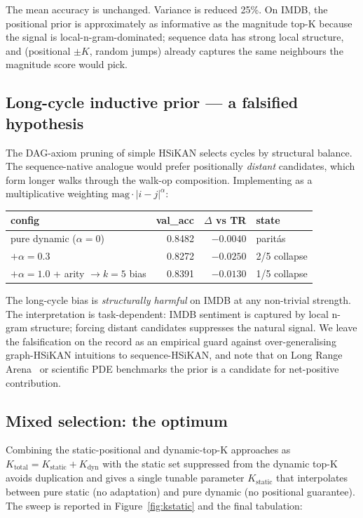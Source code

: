 \documentclass[11pt, a4paper]{article}
\begin{document}
The mean accuracy is unchanged. Variance is reduced 25\%. On IMDB,
the positional prior is approximately as informative as the
magnitude top-K because the signal is local-n-gram-dominated; sequence
data has strong local structure, and
(positional $\pm K$, random jumps) already captures the same
neighbours the magnitude score would pick.

\subsection{Long-cycle inductive prior --- a falsified hypothesis}

The DAG-axiom pruning of simple HSiKAN selects cycles by structural
balance. The sequence-native analogue would prefer positionally
\emph{distant} candidates, which form longer walks through the walk-op
composition. Implementing as a multiplicative weighting
$\mathrm{mag} \cdot |i - j|^{\alpha}$:

\begin{center}
\begin{tabular}{lrrl}
\toprule
config & val\_acc & $\Delta$ vs TR & state \\
\midrule
pure dynamic ($\alpha=0$) & 0.8482 & $-0.0040$ & paritás \\
$+ \alpha = 0.3$          & 0.8272 & $-0.0250$ & 2/5 collapse \\
$+ \alpha = 1.0$ + arity $\to k=5$ bias & 0.8391 & $-0.0130$ & 1/5 collapse \\
\bottomrule
\end{tabular}
\end{center}

The long-cycle bias is \emph{structurally harmful} on IMDB at any
non-trivial strength. The interpretation is task-dependent: IMDB
sentiment is captured by local n-gram structure; forcing distant
candidates suppresses the natural signal. We leave the falsification
on the record as an empirical guard against over-generalising
graph-HSiKAN intuitions to sequence-HSiKAN, and note that on Long
Range Arena~\cite{tay2020long} or scientific PDE benchmarks the prior
is a candidate for net-positive contribution.

\subsection{Mixed selection: the optimum}

Combining the static-positional and dynamic-top-K approaches as
$K_{\text{total}} = K_{\text{static}} + K_{\text{dyn}}$ with the
static set suppressed from the dynamic top-K avoids duplication and
gives a single tunable parameter $K_{\text{static}}$ that interpolates
between pure static (no adaptation) and pure dynamic (no positional
guarantee). The sweep is reported in Figure~\ref{fig:kstatic} and the
final tabulation:
\end{document}
